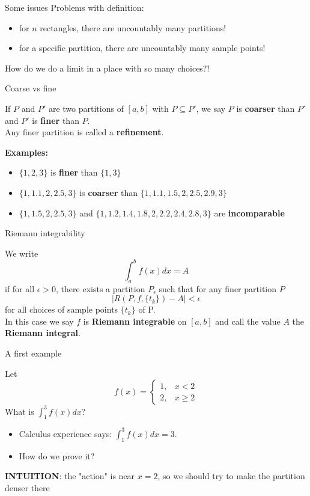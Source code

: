 \documentclass{beamer}
\begin{document}
\begin{frame}{Some issues}
Problems with definition:
\begin{itemize}
\item for $n$ rectangles, there are uncountably many partitions!
\item for a specific partition, there are uncountably many sample points!
\end{itemize}
How do we do a limit in a place with so many choices?!
\end{frame}

\begin{frame}{Coarse vs fine}
\begin{defn}
If $P$ and $P'$ are two partitions of $[a,b]$ with $P\subseteq P'$, we say $P$
is \textbf{coarser} than $P'$ and $P'$ is \textbf{finer} than $P$.\\
Any finer partition is called a \textbf{refinement}.
\end{defn}
\pause
\textbf{Examples:}
\begin{itemize}
\pause
\item $\{1,2,3\}$ is \textbf{finer} than $\{1,3\}$
\pause
\item $\{1, 1.1, 2, 2.5, 3\}$ is \textbf{coarser} than $\{1, 1.1, 1.5, 2, 2.5, 2.9, 3\}$
\pause
\item $\{1, 1.5, 2, 2.5, 3\}$ and $\{1, 1.2, 1.4, 1.8, 2, 2.2, 2.4, 2.8, 3\}$ are \textbf{incomparable}
\end{itemize}
\end{frame}

\begin{frame}{Riemann integrability}
\begin{defn}
We write 
$$\int_a^b f(x) dx = A$$
if for all $\epsilon > 0$, there exists a partition $P_\epsilon$ such that for any finer partition $P$
$$|R(P,f,\{t_k\}) - A| < \epsilon$$
for all choices of sample points $\{t_k\}$ of P.\\
In this case we say $f$ is \textbf{Riemann integrable} on $[a,b]$ and call the value $A$ the \textbf{Riemann integral}.
\end{defn}
\end{frame}

\begin{frame}{A first example}
\begin{prob}
Let
$$f(x) = \left\lbrace\begin{array}{cc}
1, & x < 2\\
2, & x \geq 2
\end{array}\right.$$
What is $\int_1^3 f(x) dx$?
\end{prob}
\begin{itemize}
\pause
\item Calculus experience says: $\int_1^3 f(x) dx = 3$.
\pause
\item How do we prove it? 
\end{itemize}
\textbf{INTUITION}: the "action" is near $x=2$, so we should try to make the partition denser there
\end{frame}
\end{document}
